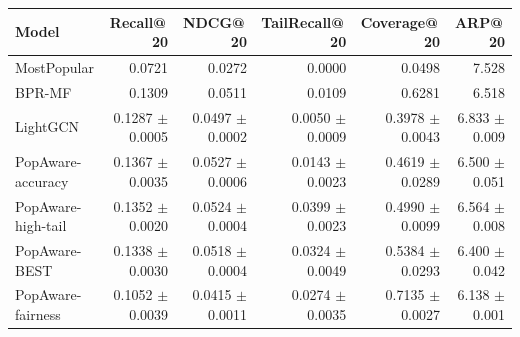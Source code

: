 \begin{tabular}{lrrrrr}
\toprule
Model & Recall@\,20 & NDCG@\,20 & TailRecall@\,20 & Coverage@\,20 & ARP@\,20 \\
\midrule
MostPopular & 0.0721 & 0.0272 & 0.0000 & 0.0498 & 7.528 \\
BPR-MF & 0.1309 & 0.0511 & 0.0109 & 0.6281 & 6.518 \\
LightGCN & 0.1287 $\pm$ 0.0005 & 0.0497 $\pm$ 0.0002 & 0.0050 $\pm$ 0.0009 & 0.3978 $\pm$ 0.0043 & 6.833 $\pm$ 0.009 \\
PopAware-accuracy & 0.1367 $\pm$ 0.0035 & 0.0527 $\pm$ 0.0006 & 0.0143 $\pm$ 0.0023 & 0.4619 $\pm$ 0.0289 & 6.500 $\pm$ 0.051 \\
PopAware-high-tail & 0.1352 $\pm$ 0.0020 & 0.0524 $\pm$ 0.0004 & 0.0399 $\pm$ 0.0023 & 0.4990 $\pm$ 0.0099 & 6.564 $\pm$ 0.008 \\
PopAware-BEST & 0.1338 $\pm$ 0.0030 & 0.0518 $\pm$ 0.0004 & 0.0324 $\pm$ 0.0049 & 0.5384 $\pm$ 0.0293 & 6.400 $\pm$ 0.042 \\
PopAware-fairness & 0.1052 $\pm$ 0.0039 & 0.0415 $\pm$ 0.0011 & 0.0274 $\pm$ 0.0035 & 0.7135 $\pm$ 0.0027 & 6.138 $\pm$ 0.001 \\
\bottomrule
\end{tabular}
